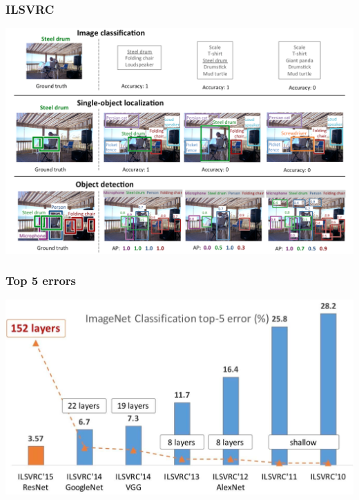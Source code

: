 \documentclass{beamer}
\begin{document}
\begin{frame}
    \frametitle{ILSVRC}
    \begin{center}
        \includegraphics[width=\textwidth]{figs/ILSVRC.png}
    \end{center}
\end{frame}

\begin{frame}
    \frametitle{Top 5 errors}
    \includegraphics[width=\textwidth]{figs/top-5.png}
   \href{https://icml.cc/2016/tutorials/icml2016_tutorial_deep_residual_networks_kaiminghe.pdf}{}
\end{frame}
\end{document}
